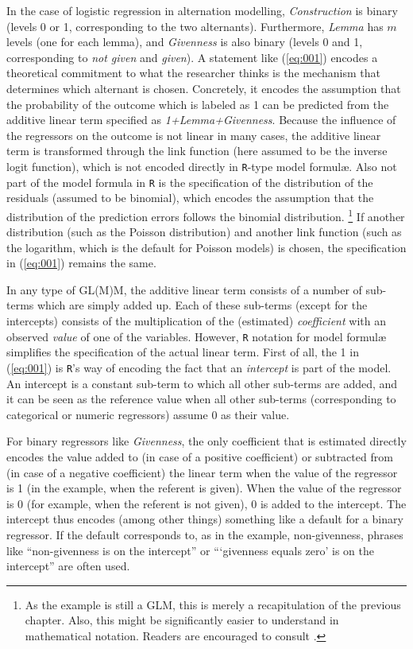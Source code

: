 
In the case of logistic regression in alternation modelling, \textit{Construction} is binary (levels 0 or 1, corresponding to the two alternants).
Furthermore, \textit{Lemma} has $m$ levels (one for each lemma), and \textit{Givenness} is also binary (levels 0 and 1, corresponding to \textit{not given} and \textit{given}).
A statement like (\ref{eq:001}) encodes a theoretical commitment to what the researcher thinks is the mechanism that determines which alternant is chosen.
Concretely, it encodes the assumption that the probability of the outcome which is labeled as 1 can be predicted from the additive linear term specified as \textit{1+Lemma+Givenness}.
Because the influence of the regressors on the outcome is not linear in many cases, the additive linear term is transformed through the link function (here assumed to be the inverse logit function), which is not encoded directly in \texttt{R}-type model formulæ.
Also not part of the model formula in \texttt{R} is the specification of the distribution of the residuals (assumed to be binomial), which encodes the assumption that the distribution of the prediction errors follows the binomial distribution.%
\footnote{As the example is still a GLM, this is merely a recapitulation of the previous chapter.
Also, this might be significantly easier to understand in mathematical notation.
Readers are encouraged to consult \citet{GelmanHill2006}.}
If another distribution (such as the Poisson distribution) and another link function (such as the logarithm, which is the default for Poisson models) is chosen, the specification in (\ref{eq:001}) remains the same.

In any type of GL(M)M, the additive linear term consists of a number of sub-terms which are simply added up.
Each of these sub-terms (except for the intercepts) consists of the multiplication of the (estimated) \textit{coefficient} with an observed \textit{value} of one of the variables.
However, \texttt{R} notation for model formulæ simplifies the specification of the actual linear term.
First of all, the 1 in (\ref{eq:001}) is \texttt{R}'s way of encoding the fact that an \textit{intercept} is part of the model.
An intercept is a constant sub-term to which all other sub-terms are added, and it can be seen as the reference value when all other sub-terms (corresponding to categorical or numeric regressors) assume 0 as their value.

For binary regressors like \textit{Givenness}, the only coefficient that is estimated directly encodes the value added to (in case of a positive coefficient) or subtracted from (in case of a negative coefficient) the linear term when the value of the regressor is 1 (in the example, when the referent is given).
When the value of the regressor is 0 (for example, when the referent is not given), 0 is added to the intercept.
The intercept thus encodes (among other things) something like a default for a binary regressor.
If the default corresponds to, as in the example, non-givenness, phrases like ``non-givenness is on the intercept'' or ```givenness equals zero' is on the intercept'' are often used.

